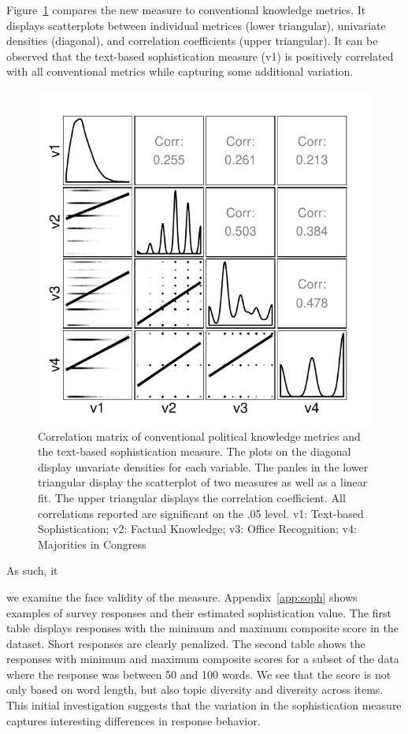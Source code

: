 \documentclass[12pt]{article}
\begin{document}
Figure~\ref{fig:corplot} compares the new measure to conventional knowledge metrics. It  displays scatterplots between individual metrices (lower triangular), univariate densities (diagonal), and correlation coefficients (upper triangular). It can be observed that the text-based sophistication measure (v1) is positively correlated with all conventional metrics while capturing some additional variation.

\begin{figure}[h]\centering
\includegraphics{../fig/corplot.pdf}
\caption{Correlation matrix of conventional political knowledge metrics and the text-based sophistication measure. The plots on the diagonal display unvariate densities for each variable. The panles in the lower triangular display the scatterplot of two measures as well as a linear fit. The upper triangular displays the correlation coefficient. All correlations reported are significant on the .05 level. v1: Text-based Sophistication; v2: Factual Knowledge; v3: Office Recognition; v4: Majorities in Congress}\label{fig:corplot}
\end{figure}

As such, it

we examine the face validity of the measure. Appendix~\ref{app:soph} shows examples of survey responses and their estimated sophistication value. The first table displays responses with the minimum and maximum composite score in the dataset.  Short responses are clearly penalized. The second table shows the responses with minimum and maximum composite scores for a subset of the data where the response was between 50 and 100 words. We see that the score is not only based on word length, but also topic diversity and diversity across items. This initial investigation suggests that the variation in the sophistication measure captures interesting differences in response behavior.
\end{document}

